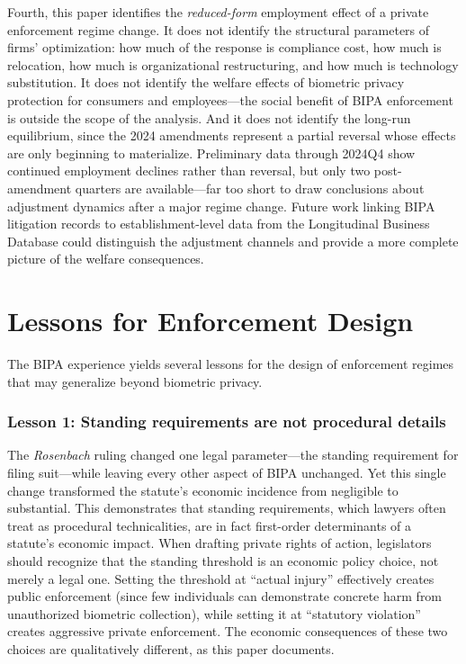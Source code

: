 \documentclass[12pt]{article}
\begin{document}
Fourth, this paper identifies the \textit{reduced-form} employment effect of a private enforcement regime change. It does not identify the structural parameters of firms' optimization: how much of the response is compliance cost, how much is relocation, how much is organizational restructuring, and how much is technology substitution. It does not identify the welfare effects of biometric privacy protection for consumers and employees---the social benefit of BIPA enforcement is outside the scope of the analysis. And it does not identify the long-run equilibrium, since the 2024 amendments represent a partial reversal whose effects are only beginning to materialize. Preliminary data through 2024Q4 show continued employment declines rather than reversal, but only two post-amendment quarters are available---far too short to draw conclusions about adjustment dynamics after a major regime change. Future work linking BIPA litigation records to establishment-level data from the Longitudinal Business Database could distinguish the adjustment channels and provide a more complete picture of the welfare consequences.

\section{Lessons for Enforcement Design}
\label{sec:lessons}

The BIPA experience yields several lessons for the design of enforcement regimes that may generalize beyond biometric privacy.

\subsubsection*{Lesson 1: Standing requirements are not procedural details} The \textit{Rosenbach} ruling changed one legal parameter---the standing requirement for filing suit---while leaving every other aspect of BIPA unchanged. Yet this single change transformed the statute's economic incidence from negligible to substantial. This demonstrates that standing requirements, which lawyers often treat as procedural technicalities, are in fact first-order determinants of a statute's economic impact. When drafting private rights of action, legislators should recognize that the standing threshold is an economic policy choice, not merely a legal one. Setting the threshold at ``actual injury'' effectively creates public enforcement (since few individuals can demonstrate concrete harm from unauthorized biometric collection), while setting it at ``statutory violation'' creates aggressive private enforcement. The economic consequences of these two choices are qualitatively different, as this paper documents.
\end{document}

